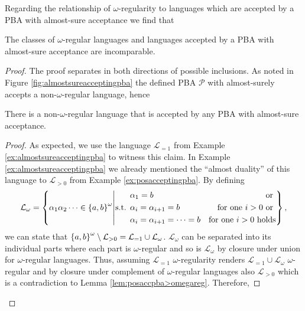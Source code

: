 Regarding the relationship of $\omega$-regularity to languages which are 
accepted by a \ac{PBA} with almost-sure acceptance we find that
\begin{theorem}
  \cite[Theorem 4, (b), (c)]{DecProblemsForProbAuto}
  The classes of $\omega$-regular languages and languages accepted by a 
  \ac{PBA} with almost-sure acceptance are incomparable.
  \label{thm:regalmostsureincomparable}
\end{theorem}
\begin{proof}
  The proof separates in both directions of possible inclusions. As noted in
  Figure \ref{fig:almostsureacceptingpba} the defined \ac{PBA} $\mathcal{P}$
  with almost-surely accepts a non-$\omega$-regular language, hence
  \begin{lemma}
    There is a non-$\omega$-regular language that is accepted by any \ac{PBA} 
    with almost-sure acceptance.
  \end{lemma}
  \begin{proof}
    As expected, we use the language $\mathcal{L}_{=1}$ from Example 
    \ref{ex:almostsureacceptingpba} to witness this claim. In Example 
    \ref{ex:almostsureacceptingpba} we already mentioned the 
    \enquote{almost duality} of this language to $\mathcal{L}_{>0}$ from 
    Example \ref{ex:posacceptingpba}. By defining
    \begin{equation*}
      \mathcal{L}_{\omega} = \left\{
        \alpha_{1}\alpha_{2}\dots\in\left\{a,b\right\}^{\omega}\middle|
        \text{s.t. }
        \begin{aligned}
          &\alpha_{1} = b&\text{or }\\
          &\alpha_{i} = \alpha_{i+1} = b&\text{for one }i>0\text{ or }\\
          &\alpha_{i} = \alpha_{i+1} = \dots = b&\text{for one }i>0\text{ holds}
        \end{aligned}
      \right\},
    \end{equation*}
    we can state that 
    $\left\{a,b\right\}^{\omega}\setminus\mathcal{L}_{>0} = 
      \mathcal{L}_{=1}\cup\mathcal{L}_{\omega}$.
    $\mathcal{L}_{\omega}$ can be separated into its individual parts where 
    each part is $\omega$-regular and so is $\mathcal{L}_{\omega}$ by closure 
    under union for $\omega$-regular languages. Thus, assuming 
    $\mathcal{L}_{=1}$ $\omega$-regularity renders 
    $\mathcal{L}_{=1}\cup\mathcal{L}_{\omega}$ $\omega$-regular and by closure 
    under complement of $\omega$-regular languages also $\mathcal{L}_{>0}$ 
    which is a contradiction to Lemma \ref{lem:posaccpba>omegareg}. Therefore, 

\end{proof}
\end{proof}
